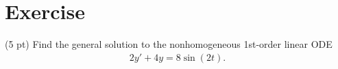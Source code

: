 %
%
\section{Exercise}

(5 pt) Find the general solution to the nonhomogeneous 1st-order linear ODE
\begin{align*}
2 y' + 4 y
=
8 \sin(2 t).
\end{align*}

